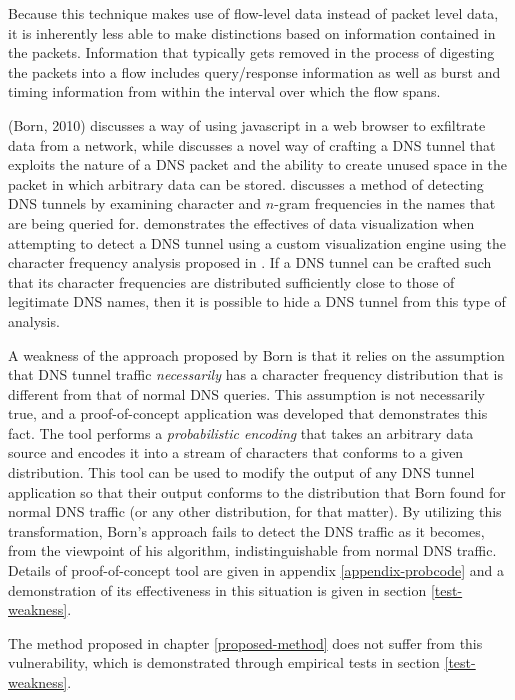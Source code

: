 \documentclass[12pt]{report}
\theoremstyle{remark}
\theoremstyle{definition}
\theoremstyle{definition}
\theoremstyle{definition}
\begin{document}
Because this technique makes use of flow-level data instead of packet level data, it
is inherently less able to make distinctions based on information contained in
the packets. Information that typically gets removed in the process of digesting
the packets into a flow includes query/response information as well as burst and
timing information from within the interval over which the flow spans.

\label{litreview-dns-cfa} (Born, 2010)\cite{Born2010.exfil} discusses a way of
using javascript in a web browser to exfiltrate data from a network, while
\cite{Born2010.psudp} discusses a novel way of crafting a DNS tunnel that
exploits the nature of a DNS packet and the ability to create unused space in
the packet in which arbitrary data can be stored. \cite{Born2010.cfa} discusses
a method of detecting DNS tunnels by examining character and $n$-gram
frequencies in the names that are being queried for. \cite{Born2010.ngviz}
demonstrates the effectives of data visualization when attempting to detect a
DNS tunnel using a custom visualization engine using the character frequency
analysis proposed in \cite{Born2010.ngviz}. If a DNS tunnel
can be crafted such that its character frequencies are distributed sufficiently
close to those of legitimate DNS names, then it is possible to hide a DNS tunnel
from this type of analysis.

A weakness of the approach proposed by Born is that it relies on the assumption
that DNS tunnel traffic \emph{necessarily} has a character frequency
distribution that is different from that of normal DNS queries. This assumption
is not necessarily true, and a proof-of-concept application was developed that
demonstrates this fact. The tool performs a \emph{probabilistic encoding} that
takes an arbitrary data source and encodes it into a stream of characters that
conforms to a given distribution. This tool can be used to modify the output of
any DNS tunnel application so that their output conforms to the distribution
that Born found for normal DNS traffic (or any other distribution, for that
matter). By utilizing this transformation, Born's approach fails to detect the
DNS traffic as it becomes, from the viewpoint of his algorithm,
indistinguishable from normal DNS traffic. Details of proof-of-concept tool are
given in appendix \ref{appendix-probcode} and a demonstration of its effectiveness in
this situation is given in section \ref{test-weakness}.

The method proposed in chapter \ref{proposed-method} does not suffer from this
vulnerability, which is demonstrated through empirical tests in section
\ref{test-weakness}.
\end{document}
